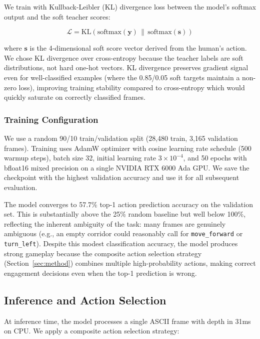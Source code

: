 \documentclass[11pt,a4paper]{article}
\begin{document}
We train with Kullback-Leibler (KL) divergence loss between the model's softmax output and the soft teacher scores:

\begin{equation}
    \mathcal{L} = \text{KL}\left(\text{softmax}(\mathbf{y}) \,\|\, \text{softmax}(\mathbf{s})\right)
\end{equation}

where $\mathbf{s}$ is the 4-dimensional soft score vector derived from the human's action. We chose KL divergence over cross-entropy because the teacher labels are soft distributions, not hard one-hot vectors. KL divergence preserves gradient signal even for well-classified examples (where the 0.85/0.05 soft targets maintain a non-zero loss), improving training stability compared to cross-entropy which would quickly saturate on correctly classified frames.

\subsubsection{Training Configuration}

We use a random 90/10 train/validation split (28,480 train, 3,165 validation frames). Training uses AdamW optimizer with cosine learning rate schedule (500 warmup steps), batch size 32, initial learning rate $3 \times 10^{-4}$, and 50 epochs with bfloat16 mixed precision on a single NVIDIA RTX 6000 Ada GPU. We save the checkpoint with the highest validation accuracy and use it for all subsequent evaluation.

The model converges to 57.7\% top-1 action prediction accuracy on the validation set. This is substantially above the 25\% random baseline but well below 100\%, reflecting the inherent ambiguity of the task: many frames are genuinely ambiguous (e.g., an empty corridor could reasonably call for \texttt{move\_forward} or \texttt{turn\_left}). Despite this modest classification accuracy, the model produces strong gameplay because the composite action selection strategy (Section~\ref{sec:method}) combines multiple high-probability actions, making correct engagement decisions even when the top-1 prediction is wrong.

\subsection{Inference and Action Selection}

At inference time, the model processes a single ASCII frame with depth in 31ms on CPU. We apply a composite action selection strategy:
\end{document}
